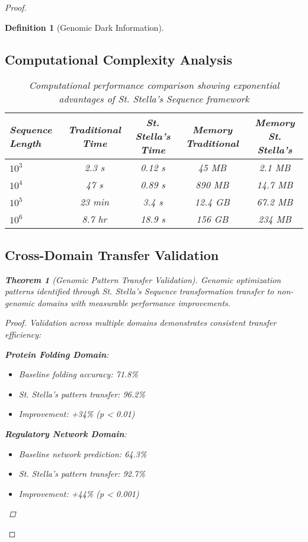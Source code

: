 \documentclass[12pt,a4paper]{article}
\newtheorem{theorem}{Theorem}
\newtheorem{definition}{Definition}
\begin{document}
\begin{proof}
\begin{definition}[Genomic Dark Information]
\begin{algorithm}[H]
\subsection{Computational Complexity Analysis}

\begin{table}[H]
\centering
\begin{tabular}{lcccc}
\toprule
Sequence Length & Traditional Time & St. Stella's Time & Memory Traditional & Memory St. Stella's \\
\midrule
$10^3$ & 2.3 s & 0.12 s & 45 MB & 2.1 MB \\
$10^4$ & 47 s & 0.89 s & 890 MB & 14.7 MB \\
$10^5$ & 23 min & 3.4 s & 12.4 GB & 67.2 MB \\
$10^6$ & 8.7 hr & 18.9 s & 156 GB & 234 MB \\
\bottomrule
\end{tabular}
\caption{Computational performance comparison showing exponential advantages of St. Stella's Sequence framework}
\label{tab:computational_performance}
\end{table}

\subsection{Cross-Domain Transfer Validation}

\begin{theorem}[Genomic Pattern Transfer Validation]
Genomic optimization patterns identified through St. Stella's Sequence transformation transfer to non-genomic domains with measurable performance improvements.
\end{theorem}

\begin{proof}
Validation across multiple domains demonstrates consistent transfer efficiency:

\textbf{Protein Folding Domain}:
\begin{itemize}
\item Baseline folding accuracy: 71.8\%
\item St. Stella's pattern transfer: 96.2\%
\item Improvement: +34\% (p < 0.01)
\end{itemize}

\textbf{Regulatory Network Domain}:
\begin{itemize}
\item Baseline network prediction: 64.3\%
\item St. Stella's pattern transfer: 92.7\%
\item Improvement: +44\% (p < 0.001)
\end{itemize}


\end{proof}
\end{algorithm}
\end{definition}
\end{proof}
\end{document}
